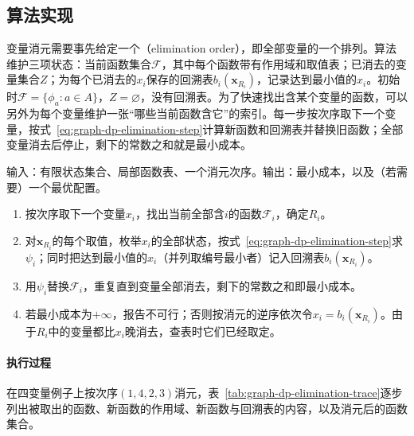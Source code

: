 \subsection{算法实现}
\label{sec:graph-dp-elimination-algorithm}

变量消元需要事先给定一个（elimination order），即全部变量的一个排列。算法维护三项状态：当前函数集合$\mathcal F$，其中每个函数带有作用域和取值表；已消去的变量集合$Z$；为每个已消去的$x_i$保存的回溯表$b_i(\bm x_{R_i})$，记录达到最小值的$x_i$。初始时$\mathcal F=\{\phi_a:a\in A\}$，$Z=\varnothing$，没有回溯表。为了快速找出含某个变量的函数，可以另外为每个变量维护一张“哪些当前函数含它”的索引。每一步按次序取下一个变量，按式~\eqref{eq:graph-dp-elimination-step}计算新函数和回溯表并替换旧函数；全部变量消去后停止，剩下的常数之和就是最小成本。

\begin{algorithm}[变量消元求最小成本]
\label{alg:graph-dp-variable-elimination}
输入：有限状态集合、局部函数表、一个消元次序。输出：最小成本，以及（若需要）一个最优配置。
\begin{enumerate}
  \item 按次序取下一个变量$x_i$，找出当前全部含$i$的函数$\mathcal F_i$，确定$R_i$。
  \item 对$\bm x_{R_i}$的每个取值，枚举$x_i$的全部状态，按式~\eqref{eq:graph-dp-elimination-step}求$\psi_i$；同时把达到最小值的$x_i$（并列取编号最小者）记入回溯表$b_i(\bm x_{R_i})$。
  \item 用$\psi_i$替换$\mathcal F_i$，重复直到变量全部消去，剩下的常数之和即最小成本。
  \item 若最小成本为$+\infty$，报告不可行；否则按消元的逆序依次令$x_i=b_i(\bm x_{R_i})$。由于$R_i$中的变量都比$x_i$晚消去，查表时它们已经取定。
\end{enumerate}
\end{algorithm}

\paragraph{执行过程}
在四变量例子上按次序$(1,4,2,3)$消元，表~\ref{tab:graph-dp-elimination-trace}逐步列出被取出的函数、新函数的作用域、新函数与回溯表的内容，以及消元后的函数集合。

